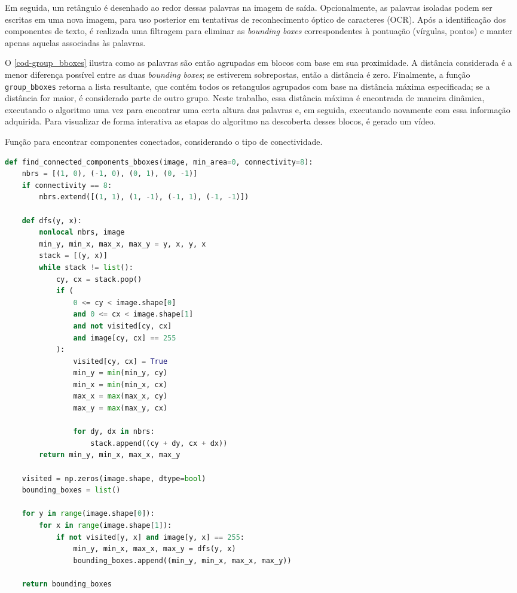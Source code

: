 \documentclass[english, 
               brazil, 
               bsc] %
               {dcomp-abntex2}
\begin{document}
Em seguida, um retângulo é desenhado ao redor dessas palavras na imagem de saída. Opcionalmente, as palavras isoladas podem ser escritas em uma nova imagem, para uso posterior em tentativas de reconhecimento óptico de caracteres (OCR). Após a identificação dos componentes de texto, é realizada uma filtragem para eliminar as \textit{bounding boxes} correspondentes à pontuação (vírgulas, pontos) e manter apenas aquelas associadas às palavras.

O \autoref{cod-group_bboxes} ilustra como as palavras são então agrupadas em blocos com base em sua proximidade. A distância considerada é a menor diferença possível entre as duas \textit{bounding boxes}; se estiverem sobrepostas, então a distância é zero. Finalmente, a função \texttt{group\_bboxes} retorna a lista resultante, que contém todos os retangulos agrupados com base na distância máxima especificada; se a distância for maior, é considerado parte de outro grupo. Neste trabalho, essa distância máxima é encontrada de maneira dinâmica, executando o algoritmo uma vez para encontrar uma certa altura das palavras e, em seguida, executando novamente com essa informação adquirida. Para visualizar de forma interativa as etapas do algoritmo na descoberta desses blocos, é gerado um vídeo.


\begin{codigo}[h]
  \caption{\small Função para encontrar componentes conectados, considerando o tipo de conectividade.}
 \label{cod-findcomp}
\begin{lstlisting}[language=python]
def find_connected_components_bboxes(image, min_area=0, connectivity=8):
    nbrs = [(1, 0), (-1, 0), (0, 1), (0, -1)]
    if connectivity == 8:
        nbrs.extend([(1, 1), (1, -1), (-1, 1), (-1, -1)])

    def dfs(y, x):
        nonlocal nbrs, image
        min_y, min_x, max_x, max_y = y, x, y, x
        stack = [(y, x)]
        while stack != list():
            cy, cx = stack.pop()
            if (
                0 <= cy < image.shape[0]
                and 0 <= cx < image.shape[1]
                and not visited[cy, cx]
                and image[cy, cx] == 255
            ):
                visited[cy, cx] = True
                min_y = min(min_y, cy)
                min_x = min(min_x, cx)
                max_x = max(max_x, cy)
                max_y = max(max_y, cx)

                for dy, dx in nbrs:
                    stack.append((cy + dy, cx + dx))
        return min_y, min_x, max_x, max_y

    visited = np.zeros(image.shape, dtype=bool)
    bounding_boxes = list()

    for y in range(image.shape[0]):
        for x in range(image.shape[1]):
            if not visited[y, x] and image[y, x] == 255:
                min_y, min_x, max_x, max_y = dfs(y, x)
                bounding_boxes.append((min_y, min_x, max_x, max_y))

    return bounding_boxes

\end{lstlisting}
\end{codigo}
\end{document}
